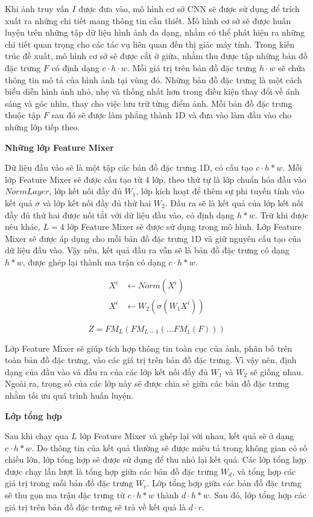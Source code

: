 Khi ảnh truy vấn $I$ được đưa vào, mô hình cơ sở CNN sẽ được sử dụng để trích xuất ra những chi tiết mang thông tin cần thiết. Mô hình cơ sở sẽ được huấn luyện trên những tập dữ liệu hình ảnh đa dạng, nhằm có thể phát hiện ra những chi tiết quan trọng cho các tác vụ liên quan đến thị giác máy tính. Trong kiến trúc đề xuất, mô hình cơ sở sẽ được cắt ở giữa, nhằm thu được tập những bản đồ đặc trưng $F$ có định dạng $c \cdot h \cdot w$. Mỗi giá trị trên bản đồ đặc trưng $h \cdot w$ sẽ chứa thông tin mô tả của hình ảnh tại vùng đó. Những bản đồ đặc trưng là một cách biểu diễn hình ảnh nhỏ, nhẹ và thống nhất hơn trong điều kiện thay đổi về ánh sáng và góc nhìn, thay cho việc lưu trữ từng điểm ảnh. Mỗi bản đồ đặc trưng thuộc tập $F$ sau đó sẽ được làm phẳng thành 1D và đưa vào làm đầu vào cho những lớp tiếp theo.

\textbf{Những lớp Feature Mixer}

Dữ liệu đầu vào sẽ là một tập các bản đồ đặc trưng 1D, có cấu tạo $c \cdot h*w$. Mỗi lớp Feature Mixer sẽ được cấu tạo từ 4 lớp, theo thứ tự là lớp chuẩn hóa đầu vào $NormLayer$, lớp kết nối đầy đủ $W_1$, lớp kích hoạt để thêm sự phi tuyến tính vào kết quả $\sigma$ và lớp kết nối đầy đủ thứ hai $W_2$. Đầu ra sẽ là kết quả của lớp kết nối đầy đủ thứ hai được nối tắt với dữ liệu đầu vào, có định dạng $h*w$. Trừ khi được nêu khác, $L=4$ lớp Feature Mixer sẽ được sử dụng trong mô hình. Lớp Feature Mixer sẽ được áp dụng cho mỗi bản đồ đặc trưng 1D và giữ nguyên cấu tạo của dữ liệu đầu vào. Vậy nên, kết quả đầu ra vẫn sẽ là bản đồ đặc trưng có dạng $h*w$, được ghép lại thành ma trận có dạng $c \cdot h*w$.

$$
\begin{aligned}
    X^{i} & \leftarrow Norm(X^{i}) \\
    X^{i} & \leftarrow W_2(\sigma(W_1 X^{i}))
\end{aligned}
$$

$$
Z = FM_L(FM_{L-1}(\dots FM_1(F)))
$$

Lớp Feature Mixer sẽ giúp tích hợp thông tin toàn cục của ảnh, phân bố trên toàn bản đồ đặc trưng, vào các giá trị trên bản đồ đặc trưng. Vì vậy nên, định dạng của đầu vào và đầu ra của các lớp kết nối đầy đủ $W_1$ và $W_2$ sẽ giống nhau. Ngoài ra, trọng số của các lớp này sẽ được chia sẻ giữa các bản đồ đặc trưng nhằm tối ưu quá trình huấn luyện.

\textbf{Lớp tổng hợp}

Sau khi chạy qua $L$ lớp Feature Mixer và ghép lại với nhau, kết quả sẽ ở dạng $c \cdot h*w$. Do thông tin của kết quả thường sẽ được miêu tả trong không gian có số chiều lớn, lớp tổng hợp sẽ được sử dụng để thu nhỏ lại kết quả. Các lớp tổng hợp được chạy lần lượt là tổng hợp giữa các bản đồ đặc trưng $W_d$, và tổng hợp các giá trị trong mỗi bản đồ đặc trưng $W_r$. Lớp tổng hợp giữa các bản đồ đặc trưng sẽ thu gọn ma trận đặc trưng từ $c \cdot h*w$ thành $d \cdot h*w$. Sau đó, lớp tổng hợp các giá trị trên bản đồ đặc trưng sẽ trả về kết quả là $d \cdot r$.

